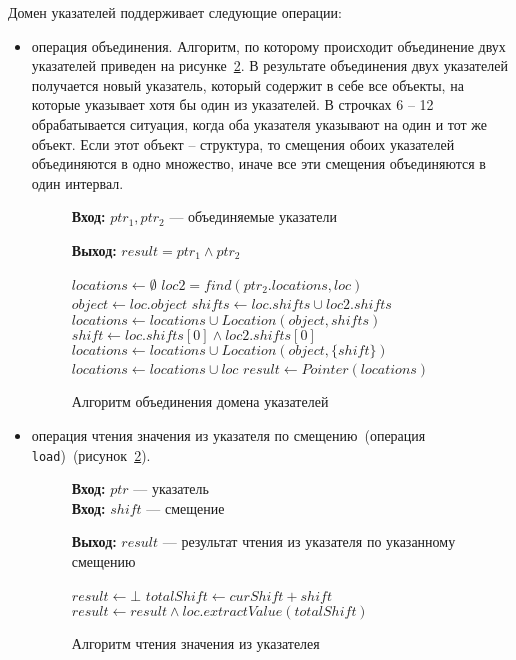 Домен указателей поддерживает следующие операции:
\begin{itemize}
\item операция объединения. Алгоритм, по которому происходит объединение
двух указателей приведен на рисунке~\ref{image:ptrJoin}. В результате 
объединения двух указателей получается новый указатель, который содержит в 
себе все объекты, на которые указывает хотя бы один из указателей. В строчках 
6 -- 12 обрабатывается ситуация, когда оба указателя указывают на один и тот 
же объект. Если этот объект -- структура, то смещения обоих указателей 
объединяются в одно множество, иначе все эти смещения объединяются в один 
интервал.
\begin{figure}[h!]
\textbf{Вход:} $ptr_1, ptr_2$ --- объединяемые указатели

\textbf{Выход:} $result = ptr_1 \wedge ptr_2$

\begin{algorithmic}[1]
\State $locations \gets \emptyset$
    \State $loc2 = find(ptr_2.locations, loc)$
        \State $object \gets loc.object$
            \State $shifts \gets loc.shifts \cup loc2.shifts$
            \State $locations \gets locations \cup Location(object, shifts)$
        \Else
            \State $shift \gets loc.shifts[0] \wedge loc2.shifts[0]$
            \State $locations \gets locations \cup Location(object, \{shift\})$
        \EndIf
    \Else
        \State $locations \gets locations \cup loc$
    \EndIf
\EndFor
\State $result \gets Pointer(locations)$
\end{algorithmic}
\caption{Алгоритм объединения домена указателей}
\label{image:ptrJoin}
\end{figure}

\item операция чтения значения из указателя по смещению~(операция 
\texttt{load})~(рисунок~\ref{image:ptrJoin}).
\begin{figure}[h!]
\textbf{Вход:} $ptr$ --- указатель\\
\textbf{Вход:} $shift$ --- смещение

\textbf{Выход:} $result$ --- результат чтения из указателя по указанному 
смещению 

\begin{algorithmic}[1]
\State $result \gets \bot$
        \State $totalShift \gets curShift + shift$
        \State $result \gets result \wedge loc.extractValue(totalShift)$
    \EndFor
\EndFor
\end{algorithmic}
\caption{Алгоритм чтения значения из указателея}
\label{image:ptrJoin}
\end{figure}


\end{itemize}
